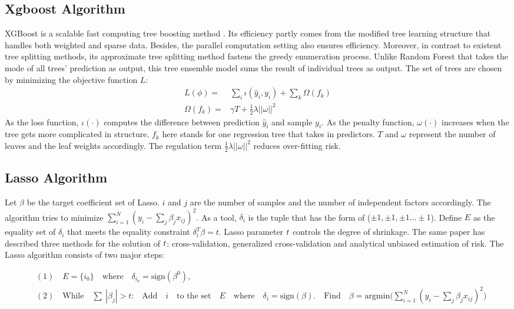 \documentclass{article}
\begin{document}
\subsection{Xgboost Algorithm}
XGBoost is a scalable fast computing tree boosting method \citep{chen2016xgboost}. Its efficiency partly comes from the modified tree learning structure that handles both weighted and sparse data. Besides, the parallel computation setting also ensures efficiency. Moreover, in contrast to existent tree splitting methods, its approximate tree splitting method fastens the greedy enumeration process.
Unlike Random Forest that takes the mode of all trees' prediction as output, this tree ensemble model sums the result of individual trees as output. The set of trees are chosen by minimizing the objective function $L$:
\begin{align}
    L(\phi) =& \sum_{i}\iota(\hat y_{i}, y_{i}) + \sum_{k}\Omega(f_{k})\\
    \Omega(f_{k}) =& \gamma T + \frac{1}{2}\lambda||\omega||^2
\end{align}
As the loss function, $\iota(\cdot)$ computes the difference between prediction $\hat y_{i}$ and sample  $y_{i}$. As the penalty function, $\omega(\cdot)$ increases when the tree gets more complicated in structure.  $f_{k}$ here stands for one regression tree that takes in predictors. $T$ and $\omega$ represent the number of leaves and the leaf weights accordingly. The regulation term $\frac{1}{2}\lambda||\omega||^2$ reduces over-fitting risk. 

\subsection{Lasso Algorithm}
Let \(\beta\) be the target coefficient set of Lasso. \(i\) and \(j\) are the number of samples and the number of independent factors accordingly. The algorithm tries to minimize \(\sum_{i = 1}^N{ (y_i - \sum_j\beta_j x_{ij})^2}\). As a tool, \(\delta_i\) is the tuple that has the form of (\(\pm1, \pm1,\pm1...\pm1\)). Define \( E\) as the equality set of \(\delta_i\) that meets the equality constraint \(\delta_i^T\beta = t\). Lasso parameter \( \mathnormal{t} \) controls the degree of shrinkage. The same paper has described three methods for the solution of  \( \mathnormal{t} \): cross-validation, generalized cross-validation and analytical unbiased estimation of risk. The Lasso algorithm consists of two major steps:
\par
\[
\begin{aligned}
&(1)\quad E =\{i_0\} \quad \textrm{where}\quad \delta_{i_0}= \textrm{sign} (\beta^0)\textrm{,}\\
&(2)\quad \textrm{While}\quad \sum\ |\beta_j| > t\textrm{:}\quad\textrm{Add}\quad i \quad \textrm{to the set} \quad E \quad \textrm{where} \quad \delta_i = \textrm{sign}(\beta).\quad \textrm{Find} \quad\beta = \textrm{argmin}(\sum_{i = 1}^N{ (y_i - \sum_j\beta_j x_{ij})^2)}
\end{aligned}
\]
\end{document}
